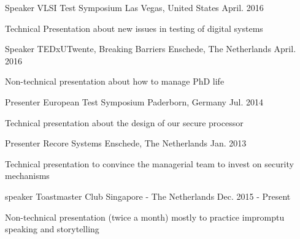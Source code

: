 

\begin{cventries}

  \cventry
    {Speaker} %
    { VLSI Test Symposium} %
    {Las Vegas, United States} %
    {April. 2016} %
    {
      \begin{cvitems} %
        \item {Technical Presentation about new issues in testing of digital systems}
      \end{cvitems}
    }
  \cventry
    {Speaker} %
    {TEDxUTwente, Breaking Barriers} %
    {Enschede, The Netherlands} %
    {April. 2016} %
    {
      \begin{cvitems} %
        \item {Non-technical presentation about how to manage PhD life}
      \end{cvitems}
    }

  \cventry
    {Presenter} %
    {European Test Symposium} %
    {Paderborn, Germany} %
    {Jul. 2014} %
    {
      \begin{cvitems} %
        \item {Technical presentation about the design of our secure processor}
      \end{cvitems}
    }

  \cventry
    {Presenter} %
    {Recore Systems} %
    {Enschede, The Netherlands} %
    {Jan. 2013} %
    {
      \begin{cvitems} %
        \item {Technical presentation to convince the managerial team to invest on security mechanisms}
      \end{cvitems}
    }

  \cventry
    {speaker} %
    {Toastmaster Club} %
    {Singapore - The Netherlands} %
    {Dec. 2015 - Present} %
    {
      \begin{cvitems} %
        \item {Non-technical presentation (twice a month) mostly to practice impromptu speaking and storytelling}
      \end{cvitems}
    }

\end{cventries}
